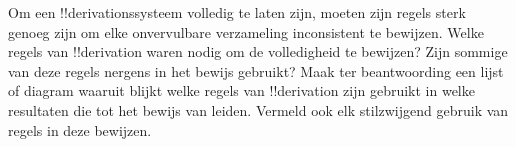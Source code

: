 \documentclass[../../../include/open-logic-section]{subfiles}
\begin{document}
\begin{prob}
Om een !!{derivation}ssysteem volledig te laten zijn, moeten zijn regels
sterk genoeg zijn om elke onvervulbare verzameling inconsistent te
bewijzen. Welke regels van !!{derivation} waren nodig om de volledigheid
te bewijzen? Zijn sommige van deze regels nergens in het bewijs gebruikt?
Maak ter beantwoording een lijst of diagram waaruit blijkt welke regels
van !!{derivation} zijn gebruikt in welke resultaten die tot het bewijs
van  leiden. Vermeld ook elk
stilzwijgend gebruik van regels in deze bewijzen.
\end{prob}
\tagendprob
\end{document}
